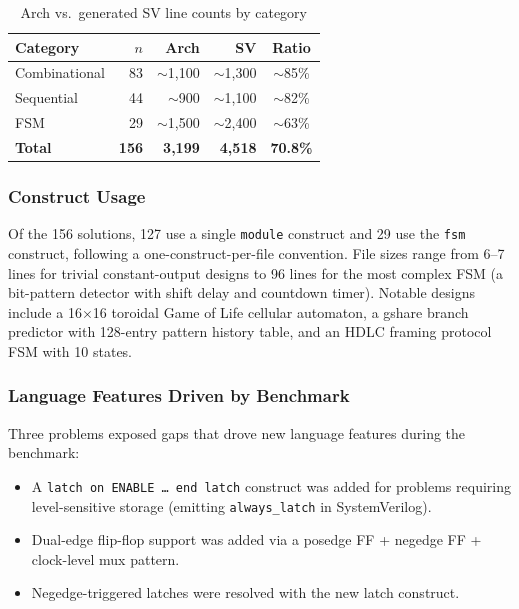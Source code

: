 \documentclass[11pt,twocolumn]{article}
\begin{document}
\begin{table}[t]
\centering
\caption{Arch vs.\ generated SV line counts by category}
\label{tab:density}
\small
\begin{tabular}{@{}lrrrc@{}}
\toprule
\textbf{Category} & \textbf{$n$} & \textbf{Arch} & \textbf{SV} & \textbf{Ratio} \\
\midrule
Combinational & 83 & ${\sim}$1,100 & ${\sim}$1,300 & ${\sim}$85\% \\
Sequential & 44 & ${\sim}$900 & ${\sim}$1,100 & ${\sim}$82\% \\
FSM & 29 & ${\sim}$1,500 & ${\sim}$2,400 & ${\sim}$63\% \\
\midrule
\textbf{Total} & \textbf{156} & \textbf{3,199} & \textbf{4,518} & \textbf{70.8\%} \\
\bottomrule
\end{tabular}
\end{table}

\subsubsection{Construct Usage}

Of the 156 solutions, 127 use a single \texttt{module} construct and 29 use the \texttt{fsm} construct, following a one-construct-per-file convention. File sizes range from 6--7 lines for trivial constant-output designs to 96 lines for the most complex FSM (a bit-pattern detector with shift delay and countdown timer). Notable designs include a 16$\times$16 toroidal Game of Life cellular automaton, a gshare branch predictor with 128-entry pattern history table, and an HDLC framing protocol FSM with 10 states.

\subsubsection{Language Features Driven by Benchmark}

Three problems exposed gaps that drove new language features during the benchmark:

\begin{itemize}
\item A \texttt{latch on ENABLE \ldots\ end latch} construct was added for problems requiring level-sensitive storage (emitting \texttt{always\_latch} in SystemVerilog).
\item Dual-edge flip-flop support was added via a posedge FF + negedge FF + clock-level mux pattern.
\item Negedge-triggered latches were resolved with the new latch construct.
\end{itemize}
\end{document}
